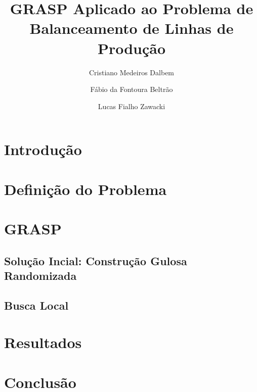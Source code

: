 \documentclass{report}
\author{Cristiano Medeiros Dalbem \and Fábio da Fontoura Beltrão \and Lucas Fialho Zawacki}
\title{GRASP Aplicado ao Problema de Balanceamento de Linhas de Produção}
\begin{document}
\maketitle
\tableofcontents

\chapter{Introdução}

\chapter{Definição do Problema}

\chapter{GRASP}

\section{Solução Incial: Construção Gulosa Randomizada}

\section{Busca Local}

\chapter{Resultados}

\chapter{Conclusão}
\end{document}
